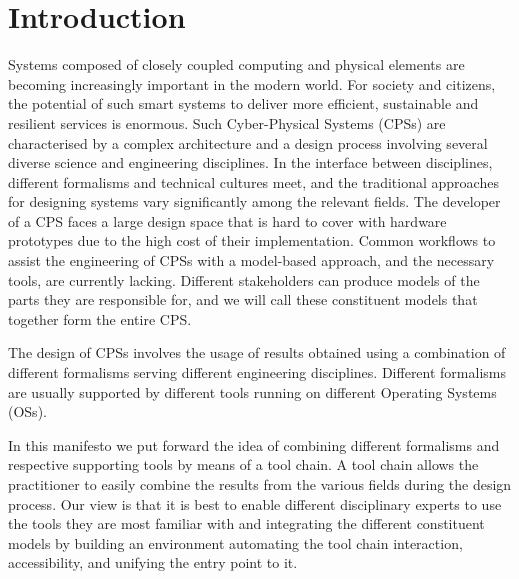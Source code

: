 
\section{Introduction}\label{sec:intro}


Systems composed of closely coupled computing and physical elements are becoming increasingly important in the modern world. For society and citizens, the potential of such smart systems to deliver more efficient, sustainable and resilient services is enormous.  Such Cyber-Physical Systems (CPSs) are characterised by a complex architecture and a design process involving several diverse science and engineering disciplines. In the interface between disciplines, different formalisms and technical cultures meet, and the traditional approaches for designing systems vary significantly among the relevant fields. 
The developer of a CPS faces a large design space that is hard to cover with hardware prototypes  due to the high cost of their implementation. Common workflows to assist the engineering of CPSs with a model-based approach, and the necessary tools, are currently lacking. Different stakeholders can produce models of the parts they are responsible for, and we will call these constituent models that together form the entire CPS. 

The design of CPSs involves the usage of results obtained
using a combination of different formalisms serving different engineering
disciplines. Different formalisms are usually
supported by different tools running on different Operating Systems (OSs). 

In this manifesto we put forward the idea of combining different formalisms and
respective supporting tools by means of a tool chain. A tool chain allows the
practitioner to easily combine the results from the various fields during the
design process.  Our view is that it is best to enable different disciplinary experts to use the tools they are most familiar with and
integrating the different constituent models by building an environment automating the tool chain
interaction, accessibility, and unifying the entry point to it. 

